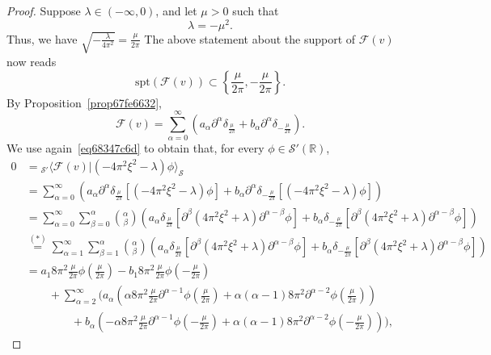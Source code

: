 \documentclass[a4paper,9pt]{amsart}
\newcommand{\scr}[1]{\mathscr{#1}}
\newcommand{\R}{\mathbb{R}}	%
\newcommand{\de}{\partial}		%
\newcommand{\spt}{\mathrm{spt}}
\theoremstyle{plain}
\theoremstyle{definition}
\theoremstyle{remark}
\begin{document}
\begin{proof}
	Suppose $\lambda\in(-\infty,0)$, and let $\mu>0$ such that
	\begin{equation}
		\lambda = -\mu^2 .
	\end{equation}
	Thus, we have $\sqrt{ -\frac{\lambda}{4\pi^2} } = \frac{\mu}{2\pi}$
	The above statement about the support of $\scr F(v)$ now reads
	\begin{equation}
		\spt( \scr F(v) ) \subset \left\{ \frac{\mu}{2\pi}, - \frac{\mu}{2\pi} \right\} .
	\end{equation}
	By Proposition~\ref{prop67fe6632},
	\begin{equation}
		\scr F(v) = \sum_{\alpha=0}^\infty \left( a_\alpha \de^\alpha \delta_{\frac{\mu}{2\pi}} + b_\alpha \de^\alpha \delta_{-\frac{\mu}{2\pi}} \right) .
	\end{equation}
	We use again~\eqref{eq68347c6d} to obtain that, for every $\phi\in\scr S'(\R)$,
	\begin{align}
		0 
		&= {}_{\scr S'}\langle \scr F(v) | (-4\pi^2 \xi^2 - \lambda)\phi \rangle_{\scr S} \\
		&= \sum_{\alpha=0}^\infty \left( a_\alpha \de^\alpha \delta_{\frac{\mu}{2\pi}}[(-4\pi^2 \xi^2 - \lambda)\phi] + b_\alpha \de^\alpha \delta_{-\frac{\mu}{2\pi}}[(-4\pi^2 \xi^2 - \lambda)\phi] \right) \\
		&= \sum_{\alpha=0}^\infty \sum_{\beta=0}^\alpha \binom{\alpha}{\beta} 
			\left( a_\alpha \delta_{\frac{\mu}{2\pi}}[\de^\beta(4\pi^2 \xi^2 + \lambda)\de^{\alpha-\beta}\phi] + b_\alpha \delta_{-\frac{\mu}{2\pi}}[\de^\beta(4\pi^2 \xi^2 + \lambda)\de^{\alpha-\beta}\phi] \right) \\
		&\overset{(*)}= \sum_{\alpha=1}^\infty \sum_{\beta=1}^\alpha \binom{\alpha}{\beta} 
			\left( a_\alpha \delta_{\frac{\mu}{2\pi}}[\de^\beta(4\pi^2 \xi^2 + \lambda)\de^{\alpha-\beta}\phi] + b_\alpha \delta_{-\frac{\mu}{2\pi}}[\de^\beta(4\pi^2 \xi^2 + \lambda)\de^{\alpha-\beta}\phi] \right) \\
		&=  a_1  8\pi^2 \frac{\mu}{2\pi} \phi(\frac{\mu}{2\pi})  
			- b_1 8\pi^2 \frac{\mu}{2\pi} \phi(-\frac{\mu}{2\pi})  \\
		&\qquad+ \sum_{\alpha=2}^\infty 
			\bigg( a_\alpha (\alpha 8\pi^2 \frac{\mu}{2\pi} \de^{\alpha-1}\phi(\frac{\mu}{2\pi}) 
				+ \alpha(\alpha-1) 8\pi^2 \de^{\alpha-2}\phi(\frac{\mu}{2\pi})  ) \\
		&\qquad\qquad	+ b_\alpha (-\alpha 8\pi^2 \frac{\mu}{2\pi} \de^{\alpha-1}\phi(-\frac{\mu}{2\pi}) 
				+ \alpha(\alpha-1) 8\pi^2 \de^{\alpha-2}\phi(-\frac{\mu}{2\pi}) )
			\bigg) ,
	\end{align}

\end{proof}
\end{document}
